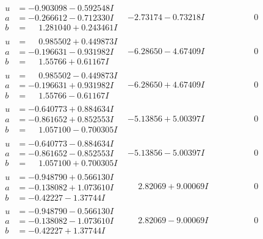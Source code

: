 \documentclass[1p]{elsarticle_modified}
\theoremstyle{definition}
\begin{document}
$$\begin{array}{c|c|c}
\begin{aligned}
u &= -0.903098 - 0.592548 I \\
a &= -0.266612 - 0.712330 I \\
b &= \phantom{-}1.281040 + 0.243461 I\end{aligned}
 & -2.73174 - 0.73218 I & \phantom{-0.000000 } 0 \\ \hline\begin{aligned}
u &= \phantom{-}0.985502 + 0.449873 I \\
a &= -0.196631 - 0.931982 I \\
b &= \phantom{-}1.55766 + 0.61167 I\end{aligned}
 & -6.28650 - 4.67409 I & \phantom{-0.000000 } 0 \\ \hline\begin{aligned}
u &= \phantom{-}0.985502 - 0.449873 I \\
a &= -0.196631 + 0.931982 I \\
b &= \phantom{-}1.55766 - 0.61167 I\end{aligned}
 & -6.28650 + 4.67409 I & \phantom{-0.000000 } 0 \\ \hline\begin{aligned}
u &= -0.640773 + 0.884634 I \\
a &= -0.861652 + 0.852553 I \\
b &= \phantom{-}1.057100 - 0.700305 I\end{aligned}
 & -5.13856 + 5.00397 I & \phantom{-0.000000 } 0 \\ \hline\begin{aligned}
u &= -0.640773 - 0.884634 I \\
a &= -0.861652 - 0.852553 I \\
b &= \phantom{-}1.057100 + 0.700305 I\end{aligned}
 & -5.13856 - 5.00397 I & \phantom{-0.000000 } 0 \\ \hline\begin{aligned}
u &= -0.948790 + 0.566130 I \\
a &= -0.138082 + 1.073610 I \\
b &= -0.42227 - 1.37744 I\end{aligned}
 & \phantom{-}2.82069 + 9.00069 I & \phantom{-0.000000 } 0 \\ \hline\begin{aligned}
u &= -0.948790 - 0.566130 I \\
a &= -0.138082 - 1.073610 I \\
b &= -0.42227 + 1.37744 I\end{aligned}
 & \phantom{-}2.82069 - 9.00069 I & \phantom{-0.000000 } 0 \\ \hline\begin{aligned}

\end{aligned}
\end{array}$$
\end{document}
